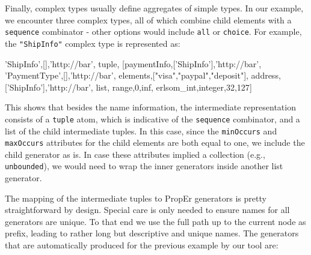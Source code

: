 \documentclass[submission,copyright]{eptcs}
\begin{document}
Finally, complex types usually define aggregates of simple types. In
our example, we encounter three complex types, all of which combine
child elements with a \texttt{sequence} combinator - other options
would include \texttt{all} or \texttt{choice}. For example, the
\texttt{"ShipInfo"} complex type is represented as:

\begin{lstline}
{{'ShipInfo',[],'http://bar'},
  {tuple,
    [{{paymentInfo,['ShipInfo'],'http://bar'},
      {{'PaymentType',[],'http://bar'},
       {elements,["visa","paypal","deposit"]}}},
     {{address,['ShipInfo'],'http://bar'},
      {list, {{range,0,inf}, {erlsom_int,integer,{32,127}}}}}]}}
\end{lstline}

This shows that besides the name information, the intermediate
representation consists of a \texttt{tuple} atom, which is indicative
of the \texttt{sequence} combinator, and a list of the child
intermediate tuples. In this case, since the \texttt{minOccurs} and
\texttt{maxOccurs} attributes for the child elements are both equal to
one, we include the child generator as is. In case these attributes
implied a collection (e.g., \texttt{unbounded}), we would need to wrap
the inner generators inside another list generator.


The mapping of the intermediate tuples to PropEr generators is pretty
straightforward by design. Special care is only needed to ensure names
for all generators are unique. To that end we use the full path up to
the current node as prefix, leading to rather long but descriptive and
unique names. The generators that are automatically produced for the
previous example by our tool are:
\end{document}
